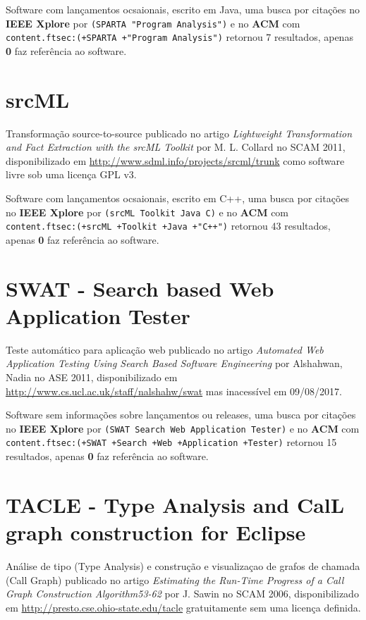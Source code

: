 Software com lançamentos ocsaionais,
escrito em Java,
uma busca por citações no {\bf IEEE Xplore} por
\texttt{(SPARTA "Program Analysis")}
e no {\bf ACM} com
\texttt{content.ftsec:(+SPARTA +"Program Analysis")}
retornou
7 resultados, apenas
{\bf 0} faz referência ao software.



\section{srcML}

Transformação source-to-source
publicado no artigo {\it Lightweight Transformation and Fact Extraction with the srcML Toolkit}
por M. L. Collard
no SCAM 2011,
disponibilizado em \url{http://www.sdml.info/projects/srcml/trunk}
como software livre
sob uma licença GPL v3.

Software com lançamentos ocsaionais,
escrito em C++,
uma busca por citações no {\bf IEEE Xplore} por
\texttt{(srcML Toolkit Java C)}
e no {\bf ACM} com
\texttt{content.ftsec:(+srcML +Toolkit +Java +"C++")}
retornou
43 resultados, apenas
{\bf 0} faz referência ao software.



\section{SWAT - Search based Web Application Tester}

Teste automático para aplicação web
publicado no artigo {\it Automated Web Application Testing Using Search Based Software Engineering}
por Alshahwan, Nadia
no ASE 2011,
disponibilizado em \url{http://www.cs.ucl.ac.uk/staff/nalshahw/swat}
mas inacessível em 09/08/2017.

Software sem informações sobre lançamentos ou releases,
uma busca por citações no {\bf IEEE Xplore} por
\texttt{(SWAT Search Web Application Tester)}
e no {\bf ACM} com
\texttt{content.ftsec:(+SWAT +Search +Web +Application +Tester)}
retornou
15 resultados, apenas
{\bf 0} faz referência ao software.



\section{TACLE - Type Analysis and CalL graph construction for Eclipse}

Análise de tipo (Type Analysis) e construção e visualizaçao de grafos de chamada (Call Graph)
publicado no artigo {\it Estimating the Run-Time Progress of a Call Graph Construction Algorithm53-62}
por J. Sawin
no SCAM 2006,
disponibilizado em \url{http://presto.cse.ohio-state.edu/tacle}
gratuitamente
sem uma licença definida.

